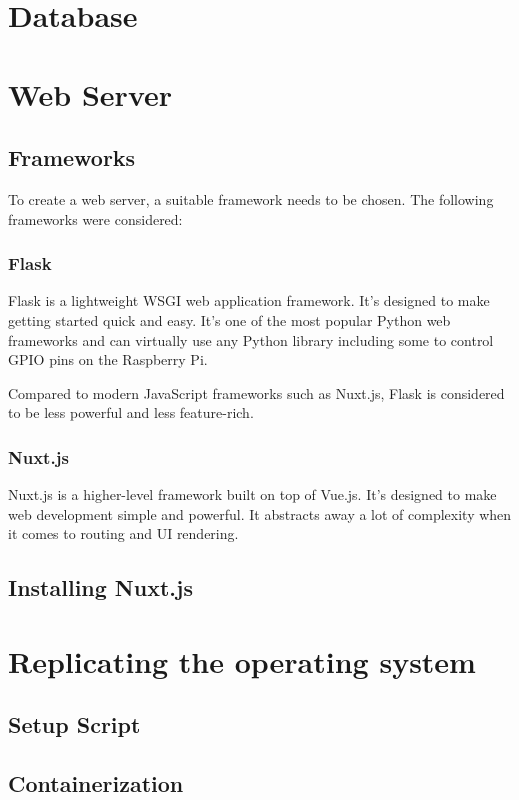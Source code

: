     \section{Database} \label{sec:database}
    \section{Web Server} \label{sec:webServer}
        \subsection{Frameworks}
        To create a web server, a suitable framework needs
        to be chosen. The following frameworks were considered:

            \subsubsection{Flask}
            Flask is a lightweight WSGI web application framework.
            It's designed to make getting started quick and easy. 
            It's one of the most popular Python web frameworks and
            can virtually use any Python library including some
            to control GPIO pins on the Raspberry Pi.

            Compared to modern JavaScript frameworks such as Nuxt.js, 
            Flask is considered to be less powerful and less 
            feature-rich.

            \subsubsection{Nuxt.js}
            Nuxt.js is a higher-level framework built on top of Vue.js.
            It's designed to make web development simple and powerful.
            It abstracts away a lot of complexity when it comes to 
            routing and UI rendering.
            
        \subsection{Installing Nuxt.js}

    \section{Replicating the operating system}
        \subsection{Setup Script}
        \subsection{Containerization}
